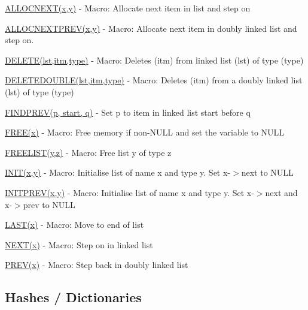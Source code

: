 \begin{DoxyItemize}
\item \hyperlink{safemem_8h_ae0a46a92b4865dd29e1ea9e0a4d64772}{A\-L\-L\-O\-C\-N\-E\-X\-T(x,y)} -\/ Macro\-: Allocate next item in list and step on
\item \hyperlink{safemem_8h_a98b4aca4c6194e23c34b1a94cfdd3901}{A\-L\-L\-O\-C\-N\-E\-X\-T\-P\-R\-E\-V(x,y)} -\/ Macro\-: Allocate next item in doubly linked list and step on.
\item \hyperlink{safemem_8h_ab866ee223048678a3d417c2e786576e4}{D\-E\-L\-E\-T\-E(lst,itm,type)} -\/ Macro\-: Deletes (itm) from linked list (lst) of type (type)
\item \hyperlink{macros_8h_a8e958d33c605063f02c1363d93f4edf8}{D\-E\-L\-E\-T\-E\-D\-O\-U\-B\-L\-E(lst,itm,type)} -\/ Macro\-: Deletes (itm) from a doubly linked list (lst) of type (type)
\item \hyperlink{macros_8h_a6c3072dd343ca017f0697dd842a9d757}{F\-I\-N\-D\-P\-R\-E\-V(p, start, q)} -\/ Set p to item in linked list start before q
\item \hyperlink{macros_8h_a25875003b43b81a4302256caa4a13599}{F\-R\-E\-E(x)} -\/ Macro\-: Free memory if non-\/\-N\-U\-L\-L and set the variable to N\-U\-L\-L
\item \hyperlink{safemem_8h_a4151f4e24778e7b290ec804c29c91f27}{F\-R\-E\-E\-L\-I\-S\-T(y,z)} -\/ Macro\-: Free list y of type z
\item \hyperlink{safemem_8h_aa167d4937e9a8d9a33c3e93bbcad8a35}{I\-N\-I\-T(x,y)} -\/ Macro\-: Initialise list of name x and type y. Set x-\/$>$next to N\-U\-L\-L
\item \hyperlink{safemem_8h_ad48f627b78d63b7af972e819978664ff}{I\-N\-I\-T\-P\-R\-E\-V(x,y)} -\/ Macro\-: Initialise list of name x and type y. Set x-\/$>$next and x-\/$>$prev to N\-U\-L\-L
\item \hyperlink{macros_8h_a49dd722216353daa94f49c2dbb53e0cb}{L\-A\-S\-T(x)} -\/ Macro\-: Move to end of list
\item \hyperlink{macros_8h_a184eb1eeb21deade2e180823b4a0e04c}{N\-E\-X\-T(x)} -\/ Macro\-: Step on in linked list
\item \hyperlink{macros_8h_a7355421c23b2dd22cec3c1ef5bc380e1}{P\-R\-E\-V(x)} -\/ Macro\-: Step back in doubly linked list
\end{DoxyItemize}

\subsection*{Hashes / Dictionaries }



